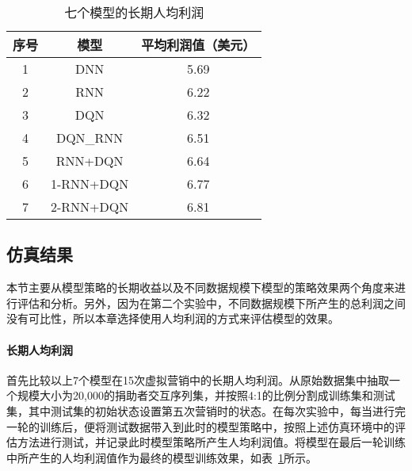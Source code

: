   \begin{table}[htbp]
  \centering
  \caption{七个模型的长期人均利润}
  \label{tab:4result0}
  \begin{tabular}{ccc}  
    \toprule
      序号 &模型 & 平均利润值（美元） \\
    \hline
      1 & DNN & 5.69\\
      2 & RNN & 6.22\\
      3 & DQN & 6.32\\
      4 & DQN_RNN & 6.51\\
      5 & RNN+DQN & 6.64\\
      6 & 1-RNN+DQN & 6.77\\
      7 & 2-RNN+DQN & 6.81 \\           
    \bottomrule
  \end{tabular}
\end{table}

\subsection{仿真结果}
本节主要从模型策略的长期收益以及不同数据规模下模型的策略效果两个角度来进行评估和分析。另外，因为在第二个实验中，不同数据规模下所产生的总利润之间没有可比性，所以本章选择使用人均利润的方式来评估模型的效果。

\paragraph{长期人均利润}
首先比较以上7个模型在15次虚拟营销中的长期人均利润。从原始数据集中抽取一个规模大小为20,000的捐助者交互序列集，并按照4:1的比例分割成训练集和测试集，其中测试集的初始状态设置第五次营销时的状态。在每次实验中，每当进行完一轮的训练后，便将测试数据带入到此时的模型策略中，按照上述仿真环境中的评估方法进行测试，并记录此时模型策略所产生人均利润值。将模型在最后一轮训练中所产生的人均利润值作为最终的模型训练效果，如表~\ref{tab:4result0}所示。

